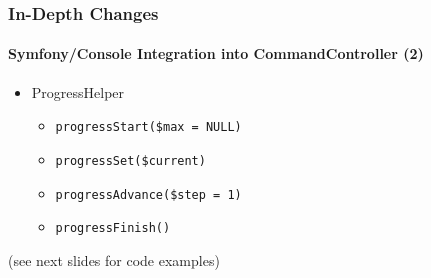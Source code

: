 
\begin{frame}[fragile]
	\frametitle{In-Depth Changes}
	\framesubtitle{Symfony/Console Integration into CommandController (2)}

	\lstset{basicstyle=\tiny\ttfamily}

	\begin{itemize}
		\item \smaller ProgressHelper
			\begin{itemize}
				\item \smaller\texttt{progressStart(\$max = NULL)}
				\item \texttt{progressSet(\$current)}
				\item \texttt{progressAdvance(\$step = 1)}
				\item \texttt{progressFinish()}
			\end{itemize}
	\end{itemize}

	\smaller
		(see next slides for code examples)
	\normalsize

\end{frame}


